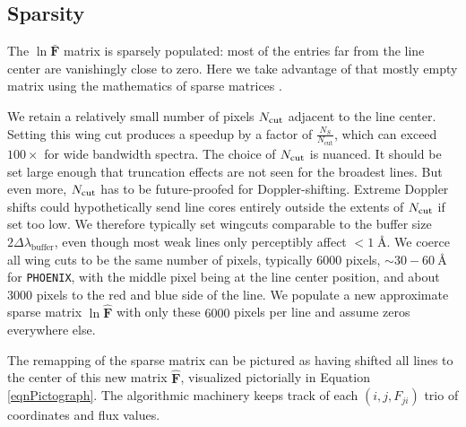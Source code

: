 \documentclass[trackchanges]{aastex631}
\begin{document}
\subsection{Sparsity}

The $\ln{\bm{\bar{F}}}$ matrix is sparsely populated: most of the entries far from the line center are vanishingly close to zero. Here we take advantage of that mostly empty matrix using the mathematics of sparse matrices \citep{saad03:IMS}.

We retain a relatively small number of pixels $N_{\rm cut}$ adjacent to the line center. Setting this wing cut produces a speedup by a factor of $\frac{N_S}{N_{\mathrm{cut}}}$, which can exceed $100\times$ for wide bandwidth spectra. The choice of $N_{\rm cut}$ is nuanced.  It should be set large enough that truncation effects are not seen for the broadest lines.  But even more, $N_{\rm cut}$ has to be future-proofed for Doppler-shifting. Extreme Doppler shifts could hypothetically send line cores entirely outside the extents of $N_{\rm cut}$ if set too low.  We therefore typically set wingcuts comparable to the buffer size $2 \Delta \lambda_{\mathrm{buffer}}$, even though most weak lines only perceptibly affect $<1\;$\AA. We coerce all wing cuts to be the same number of pixels, typically 6000 pixels, $\sim30-60~$\AA~ for \texttt{PHOENIX}, with the middle pixel being at the line center position, and about 3000 pixels to the red and blue side of the line. We populate a new approximate sparse matrix $\ln{\bm{\hat{F}}}$ with only these $6000$ pixels per line and assume zeros everywhere else.

The remapping of the sparse matrix can be pictured as having shifted all lines to the center of this new matrix $\bm{\hat{F}}$, visualized pictorially in Equation \ref{eqnPictograph}.  The algorithmic machinery keeps track of each $(i, j, F_{ji})$ trio of coordinates and flux values.
\end{document}
